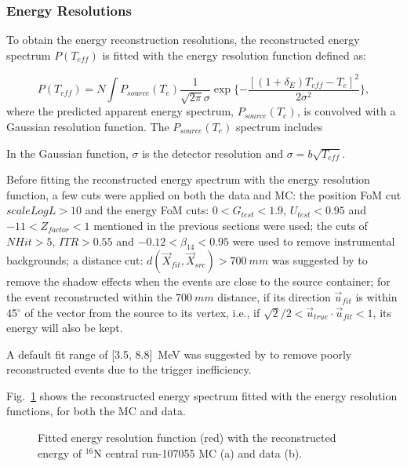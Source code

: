 \subsubsection{Energy Resolutions}

To obtain the energy reconstruction resolutions, the reconstructed energy spectrum $P(T_{eff})$ is fitted with the energy resolution function defined as\cite{waterunidoc}:

\begin{equation}
P(T_{eff})=N\int P_{source}(T_e)\frac{1}{\sqrt{2\pi}\sigma}\exp \{-\frac{[(1+\delta_E)T_{eff}-T_e]^2}{2\sigma^2}\},
\end{equation}
where the predicted apparent energy spectrum, $P_{source}(T_e)$, is convolved with a Gaussian resolution function. The $P_{source}(T_e)$ spectrum includes 

In the Gaussian function, $\sigma$ is the detector resolution and $\sigma = b\sqrt {T_{eff}}$.

Before fitting the reconstructed energy spectrum with the energy resolution function, a few cuts were applied on both the data and MC: the position FoM cut $scaleLogL>10$ and the energy FoM cuts: $0<G_{test}<1.9$, $U_{test}<0.95$ and $-11<Z_{factor}<1$ mentioned in the previous sections were used; the cuts of $NHit>5$, $ITR>0.55$ and $-0.12<\beta_{14}<0.95$ were used to remove instrumental backgrounds; a distance cut: $d(\vec{X}_{fit},\vec{X}_{src})>700~mm$ was suggested by \cite{leta,waterunidoc} to remove the shadow effects when the events are close to the source container; for the event reconstructed within the $700~mm$ distance, if its direction $\vec{u}_{fit}$ is within 45$^\circ$ of the vector from the source to its vertex, i.e., if $\sqrt2/2<\vec{u}_{true}\cdot \vec{u}_{fit}<1$, its energy will also be kept.

A default fit range of [3.5, 8.8]~MeV was suggested by \cite{waterunidoc} to remove poorly reconstructed events due to the trigger inefficiency.

Fig.~\ref{fittedEnergyResol} shows the reconstructed energy spectrum fitted with the energy resolution functions, for both the MC and data.
\begin{figure}
	\centering
	\caption{Fitted energy resolution function (red) with the reconstructed energy of $^{16}$N central run-107055 MC (a) and data (b).}
	\label{fittedEnergyResol}
\end{figure}

